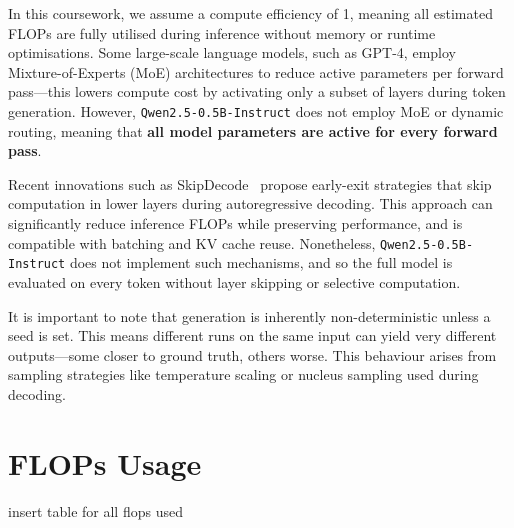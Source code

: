 \documentclass[a4paper,12pt]{article}
\begin{document}
In this coursework, we assume a compute efficiency of 1, meaning all estimated FLOPs are fully utilised during inference without memory or runtime optimisations. Some large-scale language models, such as GPT-4, employ Mixture-of-Experts (MoE) architectures to reduce active parameters per forward pass—this lowers compute cost by activating only a subset of layers during token generation. However, \texttt{Qwen2.5-0.5B-Instruct} does not employ MoE or dynamic routing, meaning that \textbf{all model parameters are active for every forward pass}.

Recent innovations such as SkipDecode~\cite{delcorro2023skipdecode} propose early-exit strategies that skip computation in lower layers during autoregressive decoding. This approach can significantly reduce inference FLOPs while preserving performance, and is compatible with batching and KV cache reuse. Nonetheless, \texttt{Qwen2.5-0.5B-Instruct} does not implement such mechanisms, and so the full model is evaluated on every token without layer skipping or selective computation.

It is important to note that generation is inherently non-deterministic unless a seed is set. This means different runs on the same input can yield very different outputs—some closer to ground truth, others worse. This behaviour arises from sampling strategies like temperature scaling or nucleus sampling used during decoding.


\section{FLOPs Usage}

insert table for all flops used








\end{document}
